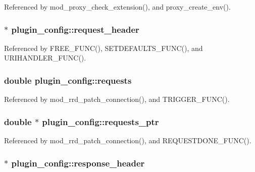Referenced by mod\-\_\-proxy\-\_\-check\-\_\-extension(), and proxy\-\_\-create\-\_\-env().

\hypertarget{structplugin__config_ae02d4e475dc2263c8b30e000712ba940}{
\subsubsection[{request\-\_\-header}]{$\ast$ plugin\-\_\-config\-::request\-\_\-header}}\label{structplugin__config_ae02d4e475dc2263c8b30e000712ba940}


Referenced by F\-R\-E\-E\-\_\-\-F\-U\-N\-C(), S\-E\-T\-D\-E\-F\-A\-U\-L\-T\-S\-\_\-\-F\-U\-N\-C(), and U\-R\-I\-H\-A\-N\-D\-L\-E\-R\-\_\-\-F\-U\-N\-C().

\hypertarget{structplugin__config_a7254db6479d2b2ca596b0615cfbf1e52}{
\subsubsection[{requests}]{\setlength{\rightskip}{0pt plus 5cm}double plugin\-\_\-config\-::requests}}\label{structplugin__config_a7254db6479d2b2ca596b0615cfbf1e52}


Referenced by mod\-\_\-rrd\-\_\-patch\-\_\-connection(), and T\-R\-I\-G\-G\-E\-R\-\_\-\-F\-U\-N\-C().

\hypertarget{structplugin__config_a419904fb4dba3b8b2497c89c8550ece7}{
\subsubsection[{requests\-\_\-ptr}]{\setlength{\rightskip}{0pt plus 5cm}double $\ast$ plugin\-\_\-config\-::requests\-\_\-ptr}}\label{structplugin__config_a419904fb4dba3b8b2497c89c8550ece7}


Referenced by mod\-\_\-rrd\-\_\-patch\-\_\-connection(), and R\-E\-Q\-U\-E\-S\-T\-D\-O\-N\-E\-\_\-\-F\-U\-N\-C().

\hypertarget{structplugin__config_afc9d60926d1c47c62278bec1ded34470}{
\subsubsection[{response\-\_\-header}]{$\ast$ plugin\-\_\-config\-::response\-\_\-header}}\label{structplugin__config_afc9d60926d1c47c62278bec1ded34470}


